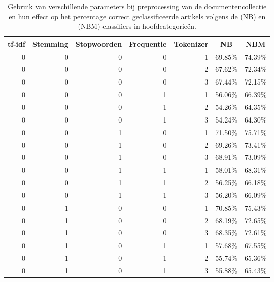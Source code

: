 \newpage
\begin{longtable}{rrrrrrr}
	\caption{Gebruik van verschillende parameters bij preprocessing van de documentencollectie  en hun effect op het percentage correct geclassificeerde artikels volgens de  (NB) en  (NBM) classifiers in hoofdcategorie\"en.}\\
	\toprule
	\multicolumn{1}{c}{\textbf{tf-idf}} & \multicolumn{1}{c}{\textbf{Stemming}} & \multicolumn{1}{c}{\textbf{Stopwoorden}} & \multicolumn{1}{c}{\textbf{Frequentie}} & \multicolumn{1}{c}{\textbf{Tokenizer}} & \multicolumn{1}{c}{\textbf{NB}} & \multicolumn{1}{c}{\textbf{NBM}} \\
	\midrule
	0     & 0     & 0     & 0     & 1     & 69.85\% & 74.39\% \\
	0     & 0     & 0     & 0     & 2     & 67.62\% & 72.34\% \\
	0     & 0     & 0     & 0     & 3     & 67.44\% & 72.15\% \\
	0     & 0     & 0     & 1     & 1     & 56.06\% & 66.39\% \\
	0     & 0     & 0     & 1     & 2     & 54.26\% & 64.35\% \\
	0     & 0     & 0     & 1     & 3     & 54.24\% & 64.30\% \\
	0     & 0     & 1     & 0     & 1     & 71.50\% & 75.71\% \\
	0     & 0     & 1     & 0     & 2     & 69.26\% & 73.41\% \\
	0     & 0     & 1     & 0     & 3     & 68.91\% & 73.09\% \\
	0     & 0     & 1     & 1     & 1     & 58.01\% & 68.31\% \\
	0     & 0     & 1     & 1     & 2     & 56.25\% & 66.18\% \\
	0     & 0     & 1     & 1     & 3     & 56.20\% & 66.09\% \\
	0     & 1     & 0     & 0     & 1     & 70.85\% & 75.43\% \\
	0     & 1     & 0     & 0     & 2     & 68.19\% & 72.65\% \\
	0     & 1     & 0     & 0     & 3     & 68.35\% & 72.61\% \\
	0     & 1     & 0     & 1     & 1     & 57.68\% & 67.55\% \\
	0     & 1     & 0     & 1     & 2     & 55.74\% & 65.36\% \\
	0     & 1     & 0     & 1     & 3     & 55.88\% & 65.43\% \\

\end{longtable}
